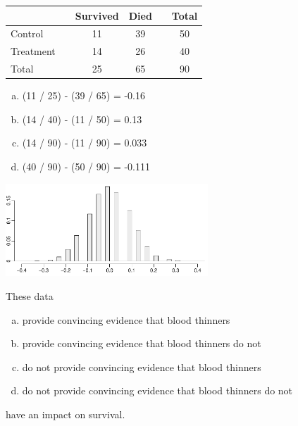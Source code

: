 \documentclass[11pt,containsverbatim,handout,xcolor=xelatex,dvipsnames,table]{beamer}
\newcommand{\solnMult}[1]{#1}
\begin{document}

\begin{frame}


\begin{center}
\begin{tabular}{lccccc}
\hline
			&& Survived 	& Died 	&& Total \\
\hline
Control		&& 11		& 39		&& 50 \\
Treatment		&& 14		& 26		&& 40 \\
\hline
Total			&& 25		& 65		&& 90 \\
\hline
\end{tabular}
\end{center}

\begin{enumerate}[(a)]
\item (11 / 25) - (39 / 65) = -0.16
\item \solnMult{(14 / 40) - (11 / 50) = 0.13}
\item (14 / 90) - (11 / 90) = 0.033
\item (40 / 90) - (50 / 90) = -0.111
\end{enumerate}

\end{frame}


\begin{frame}


\begin{center}
\includegraphics[width=0.57\textwidth]{figures/cpr/cpr_rand_dist}
\end{center}

{\small
These data 
\begin{enumerate}[(a)]
\item provide convincing evidence that blood thinners 
\item provide convincing evidence that blood thinners do not
\item \solnMult{do not provide convincing evidence that blood thinners}
\item do not provide convincing evidence that blood thinners do not
\end{enumerate}
have an impact on survival.
}

\end{frame}
\end{document}
